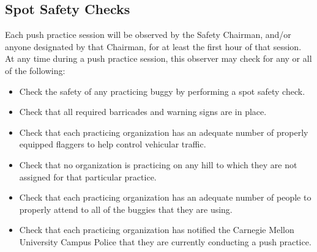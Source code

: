 \subsection{Spot Safety Checks}

	Each push practice session will be observed by the Safety Chairman, and/or
	anyone designated by that Chairman, for at least the first hour of that
	session. At any time during a push practice session, this observer may check
	for any or all of the following:

	\begin{itemize}

		\item Check the safety of any practicing buggy by performing a spot safety
		check.

		\item Check that all required barricades and warning signs are in place.

		\item Check that each practicing organization has an adequate number of
		properly equipped flaggers to help control vehicular traffic.

		\item Check that no organization is practicing on any hill to which they
		are not assigned for that particular practice.

		\item Check that each practicing organization has an adequate number of
		people to properly attend to all of the buggies that they are using.  \item
		Check that each practicing organization has notified the Carnegie Mellon
		University Campus Police that they are currently conducting a push practice.

	\end{itemize}


